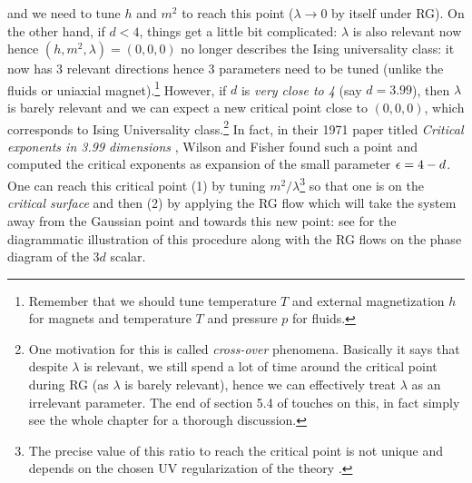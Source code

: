 and we need to tune $h$ and $m^2$ to reach this point ($\lambda\rightarrow 0$ by itself under RG). On the other hand, if $d<4$, things get a little bit complicated: $\lambda$ is also relevant now hence $(h,m^2,\lambda)=(0,0,0)$ no longer describes the Ising universality class: it now has 3 relevant directions hence 3 parameters need to be tuned (unlike the fluids or uniaxial magnet).\footnote{Remember that we should tune temperature $T$ and external magnetization $h$ for magnets and temperature $T$ and pressure $p$ for fluids.} However, if $d$ is \emph{very close to 4} (say $d=3.99$), then $\lambda$ is barely relevant and we can expect a new critical point close to $(0,0,0)$, which corresponds to Ising Universality class.\footnote{One motivation for this is called \emph{cross-over} phenomena. Basically it says that despite $\lambda$ is relevant, we still spend a lot of time around the critical point during RG (as $\lambda$ is barely relevant), hence we can effectively treat $\lambda$ as an irrelevant parameter. The end of section 5.4 of \cite{Cardy:1996xt} touches on this, in fact simply see the whole chapter for a thorough discussion.} In fact, in their 1971 paper titled \emph{Critical exponents in 3.99 dimensions} \cite{Wilson:1971dc}, Wilson and Fisher found such a point and computed the critical exponents as expansion of the small parameter $\epsilon=4-d$. One can reach this critical point (1) by tuning $m^2/\lambda$\footnote{The precise value of this ratio to reach the critical point is not unique and depends on the chosen UV regularization of the theory \cite{Simmons-Duffin:2016gjk}.} so that one is on the \emph{critical surface} and then (2) by applying the RG flow which will take the system away from the Gaussian point and towards this new point: see \figref{\ref{fig: Wilson-fisher}} for the diagrammatic illustration of this procedure along with the RG flows on the phase diagram of the $3d$ scalar.

